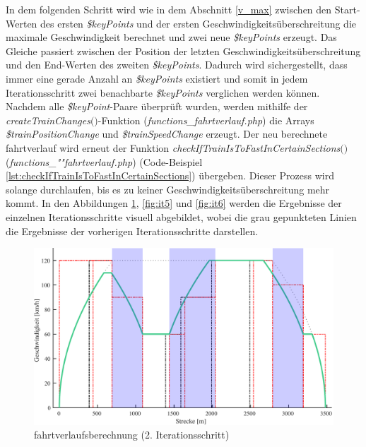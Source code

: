 In dem fol\-gen\-den Schritt wird wie in dem Abschnitt \ref{v_max} zwischen den Start-Werten des ersten \textit{\$keyPoints} und der ersten Geschwindigkeitsüberschreitung die maximale Geschwindigkeit berechnet und zwei neue \textit{\$keyPoints} erzeugt. Das Gleiche passiert zwischen der Position der letzten Geschwindigkeitsüberschreitung und den End-Werten des zweiten \textit{\$keyPoints}. Dadurch wird sichergestellt, dass immer eine gerade Anzahl an \textit{\$keyPoints} existiert und somit in jedem Iterationsschritt zwei benachbarte \textit{\$keyPoints} verglichen werden können. Nachdem alle \textit{\$keyPoint}-Paare überprüft wurden, werden mithilfe der \textit{create\-Train\-Changes$($$)$}-Funktion (\textit{functions\_fahrtverlauf.php}) die \mbox{Arrays} \textit{\$train\-Position\-Change} und \textit{\$train\-Speed\-Change} erzeugt. Der neu berechnete \Gls{fahrtverlauf} wird erneut der Funktion \textit{check\-If\-Train\-Is\-To\-Fast\-In\-Certain\-Sections$($$)$} (\textit{func\-tions\_""fahrt\-ver\-lauf\-.php}) (Code-Bei\-spiel \ref{lst:checkIfTrainIsToFastInCertainSections}) übergeben. Dieser Prozess wird solange durchlaufen, bis es zu keiner Geschwindigkeitsüberschreitung mehr kommt. In den Abbildungen \ref{fig:it4}, \ref{fig:it5} und \ref{fig:it6} werden die Ergebnisse der einzelnen Iterationsschritte visuell abgebildet, wobei die grau gepunkteten Linien die Ergebnisse der vorherigen Iterationsschritte darstellen.
\begin{figure}
\includegraphics[width=\linewidth]{../images/matlab/it4.pdf}
\caption{\Gls{fahrtverlauf}sberechnung (2. Iterationsschritt)}
\label{fig:it4}
\end{figure}
